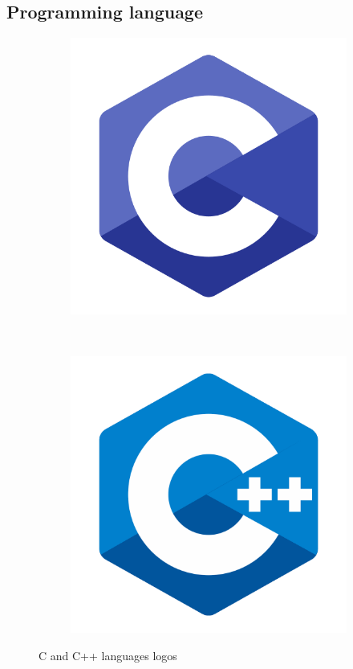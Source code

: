 \documentclass[a4paper,twoside,12pt]{book}
\begin{document}
\subsection{Programming language}

\begin{figure}[H]
    \centering
    \begin{subfigure}[h]{0.3\textwidth}
        \includegraphics[width=\textwidth]{images/c_logo}
        \label{fig:c}
    \end{subfigure}
    ~
    \begin{subfigure}[h]{0.3\textwidth}
        \includegraphics[width=\textwidth]{images/cpp_logo}
        \label{fig:cpp}
    \end{subfigure}
    \caption{C and C++ languages logos}
    \label{fig:lang}
\end{figure}
\end{document}
